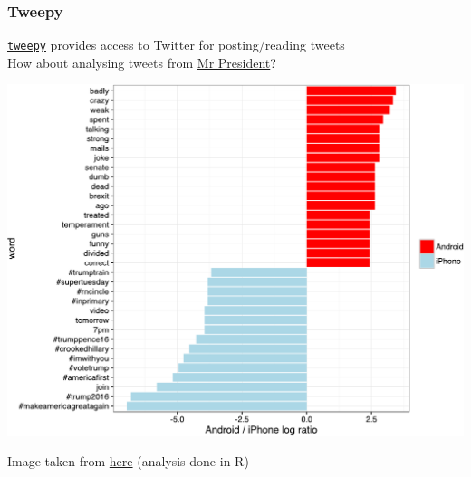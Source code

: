 \documentclass[pdf]{beamer}
\begin{document}
\begin{frame}[fragile]
\frametitle{Tweepy}

\href{http://www.tweepy.org/}{\texttt{tweepy}} provides
access to Twitter for posting/reading tweets
\\[0.5em]
How about analysing tweets from
\href{https://keithselover.wordpress.com/2016/08/31/a-look-at-trump-and-clintons-tweets-using-tweepy-part-2-term-frequency/}{Mr President}?

\vspace{0.3cm}

\centering
\includegraphics[width=.65\textwidth]{tweepy.pdf}

\scriptsize
Image taken from \href{http://varianceexplained.org/r/trump-tweets/}{here} (analysis done in R) 
\normalsize

\end{frame}

\end{document}
